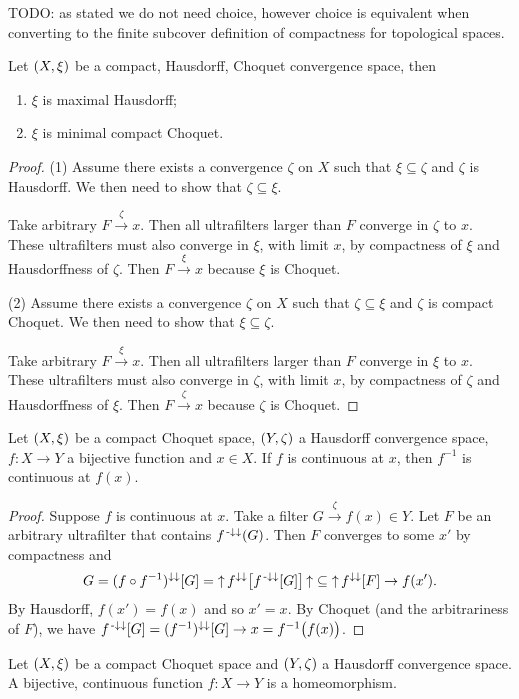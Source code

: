 TODO: as stated we do not need choice, however choice is equivalent when converting to the finite subcover definition of compactness for topological spaces.

\begin{proposition} \label{maximalHausdroffMinimalCompactChoquet}
Let $\sSet{X,\xi}$ be a compact, Hausdorff, Choquet convergence space, then
\begin{enumerate}
\item $\xi$ is maximal Hausdorff;
\item $\xi$ is minimal compact Choquet.
\end{enumerate}
\end{proposition}
\begin{proof}
(1) Assume there exists a convergence $\zeta$ on $X$ such that $\xi \subseteq \zeta$ and $\zeta$ is Hausdorff. We then need to show that $\zeta \subseteq \xi$.

Take arbitrary $F \overset{\zeta}{\longrightarrow} x$. Then all ultrafilters larger than $F$ converge in $\zeta$ to $x$. These ultrafilters must also converge in $\xi$, with limit $x$, by compactness of $\xi$ and Hausdorffness of $\zeta$. Then $F \overset{\xi}{\longrightarrow} x$ because $\xi$ is Choquet.

(2) Assume there exists a convergence $\zeta$ on $X$ such that $\zeta \subseteq \xi$ and $\zeta$ is compact Choquet. We then need to show that $\xi \subseteq \zeta$.

Take arbitrary $F \overset{\xi}{\longrightarrow} x$. Then all ultrafilters larger than $F$ converge in $\xi$ to $x$. These ultrafilters must also converge in $\zeta$, with limit $x$, by compactness of $\zeta$ and Hausdorffness of $\xi$. Then $F \overset{\zeta}{\longrightarrow} x$ because $\zeta$ is Choquet.
\end{proof}

\begin{proposition} \label{compactToHausdorffInverseContinuousAtPoint}
Let $\sSet{X,\xi}$ be a compact Choquet space, $\sSet{Y, \zeta}$ a Hausdorff convergence space, $f: X\to Y$ a bijective function and $x\in X$. If $f$ is continuous at $x$, then $f^{-1}$ is continuous at $f(x)$.
\end{proposition}
\begin{proof}
Suppose $f$ is continuous at $x$. Take a filter $G\overset{\zeta}{\longrightarrow} f(x) \in Y$. Let $F$ be an arbitrary ultrafilter that contains $f^{{\text{\hspace{0.15em}-}\downarrow}\downarrow}(G)$. Then $F$ converges to some $x'$ by compactness and
\[ G = (f\circ f^{-1})^{\downarrow\downarrow}[G] = \operatorname{\uparrow} f^{\downarrow\downarrow}\big[f^{{\text{\hspace{0.15em}-}\downarrow}\downarrow}[G]\big]\operatorname{\uparrow} \subseteq \operatorname{\uparrow} f^{\downarrow\downarrow}[F] \to f(x'). \]
By Hausdorff, $f(x') = f(x)$ and so $x' = x$. By Choquet (and the arbitrariness of $F$), we have $f^{{\text{\hspace{0.15em}-}\downarrow}\downarrow}[G] = (f^{-1})^{\downarrow\downarrow}[G] \to x = f^{-1}\big(f(x)\big)$.
\end{proof}
\begin{corollary} \label{compactToHausdorffHomeomorphism}
Let $\sSet{X,\xi}$ be a compact Choquet space and $\sSet{Y, \zeta}$ a Hausdorff convergence space. A bijective, continuous function $f: X\to Y$ is a homeomorphism.
\end{corollary}


